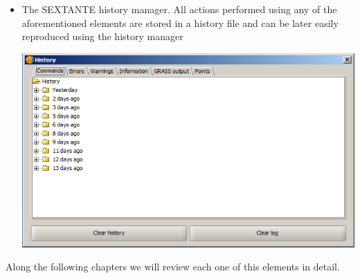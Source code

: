 \begin{itemize}
\begin{center}
		\end{center}
	\item The SEXTANTE history manager. All actions performed using any of the aforementioned elements are stored in a history file and can be later easily reproduced using the history manager
			\begin{center}
			\includegraphics[width=.8\columnwidth]{history.png}
			\end{center}	
\end{itemize}

Along the following chapters we will review each one of this elements in detail.